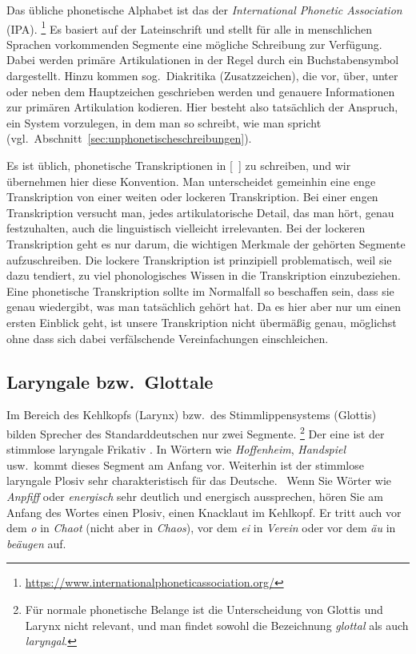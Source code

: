 Das übliche phonetische Alphabet ist das der \textit{International Phonetic Association} (IPA).%
\footnote{\url{https://www.internationalphoneticassociation.org/}}	
Es basiert auf der Lateinschrift und stellt für alle in menschlichen Sprachen vorkommenden Segmente eine mögliche Schreibung zur Verfügung.
Dabei werden primäre Artikulationen in der Regel durch ein Buchstabensymbol dargestellt.
Hinzu kommen sog.\ Diakritika (Zusatzzeichen), die vor, über, unter oder neben dem Hauptzeichen geschrieben werden und genauere Informationen zur primären Artikulation kodieren.
Hier besteht also tatsächlich der Anspruch, ein System vorzulegen, in dem man so schreibt, wie man spricht (vgl.\ Abschnitt~\ref{sec:unphonetischeschreibungen}).

Es ist üblich, phonetische Transkriptionen in [~] zu schreiben, und wir übernehmen hier diese Konvention.
Man unterscheidet gemeinhin eine enge Transkription von einer weiten oder lockeren Transkription.
Bei einer engen Transkription versucht man, jedes artikulatorische Detail, das man hört, genau festzuhalten, auch die linguistisch vielleicht irrelevanten.
Bei der lockeren Transkription geht es nur darum, die wichtigen Merkmale der gehörten Segmente aufzuschreiben.
Die lockere Transkription ist prinzipiell problematisch, weil sie dazu tendiert, zu viel phonologisches Wissen in die Transkription einzubeziehen.
Eine phonetische Transkription sollte im Normalfall so beschaffen sein, dass sie genau wiedergibt, was man tatsächlich gehört hat.
Da es hier aber nur um einen ersten Einblick geht, ist unsere Transkription nicht übermäßig genau, möglichst ohne dass sich dabei verfälschende Vereinfachungen einschleichen.

\subsection{Laryngale bzw.\ Glottale}

\label{sec:photlaryngale}


Im Bereich des Kehlkopfs (Larynx) bzw.\ des Stimmlippensystems (Glottis) bilden Sprecher des Standarddeutschen nur zwei Segmente.%
\footnote{Für normale phonetische Belange ist die Unterscheidung von Glottis und Larynx nicht relevant, und man findet sowohl die Bezeichnung \textit{glottal} als auch \textit{laryngal}.}
Der eine ist der stimmlose laryngale Frikativ \textipa{[h]}.
In Wörtern wie \textit{Hoffenheim}, \textit{Handspiel} usw.\ kommt dieses Segment am Anfang vor.
Weiterhin ist der stimmlose laryngale Plosiv \textipa{[P]} sehr charakteristisch für das Deutsche.
\TuBegin~Wenn Sie Wörter wie \textit{Anpfiff} oder \textit{energisch} sehr deutlich und energisch aussprechen, hören Sie am Anfang des Wortes einen Plosiv, einen Knacklaut im Kehlkopf.
Er tritt auch vor dem \textit{o} in \textit{Chaot} (nicht aber in \textit{Chaos}), vor dem \textit{ei} in \textit{Verein} oder vor dem \textit{äu} in \textit{beäugen} auf.

